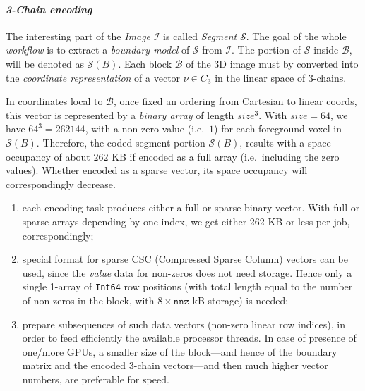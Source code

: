 \documentclass[11pt, oneside]{amsart}   	%
\begin{document}
\paragraph{\emph{3-Chain encoding}}
The interesting part of the \emph{Image} $\mathcal{I}$ is called \emph{Segment} $\mathcal{S}$. The goal of the whole \emph{workflow} is to extract a \emph{boundary model} of $\mathcal{S}$ from $\mathcal{I}$. The portion of $\mathcal{S}$ inside $\mathcal{B}$, will be denoted as $\mathcal{S}(B)$.
Each block $\mathcal{B}$ of the 3D image must by converted into the \emph{coordinate representation} of a vector $\nu\in C_3$ in the linear space  of 3-chains. 

In coordinates local to $\mathcal{B}$, once fixed an ordering from Cartesian to linear coords, this vector is represented by a \emph{binary array} of length $size^3$. With $size=64$, we have $64^3=262144$,  with a non-zero value (i.e.~$1$) for each foreground voxel in $\mathcal{S}(B)$. Therefore, the coded segment portion $\mathcal{S}(B)$, results with a space occupancy of about $262$ KB if encoded as a full array (i.e.~including the zero values). Whether encoded as a sparse vector, its space occupancy will correspondingly decrease.

\begin{enumerate}

\item each encoding task produces either a full or sparse binary vector. With full or sparse arrays depending by one index, we get either 262 KB or less per job, correspondingly;

\item special format for sparse CSC (Compressed Sparse Column) vectors can be used, since the \emph{value} data for non-zeros does not need storage. Hence only a single 1-array of \texttt{Int64} row positions (with total length equal to the number of non-zeros in the block, with $8\times\mathtt{nnz}$ kB storage) is needed;

\item prepare subsequences of such data vectors (non-zero linear row indices), in order to feed efficiently the available processor threads.
In case of presence of one/more GPUs, a smaller size of the block---and hence of the boundary matrix and the encoded 3-chain vectors---and then much higher vector numbers, are preferable for speed.

\end{enumerate}
\end{document}
